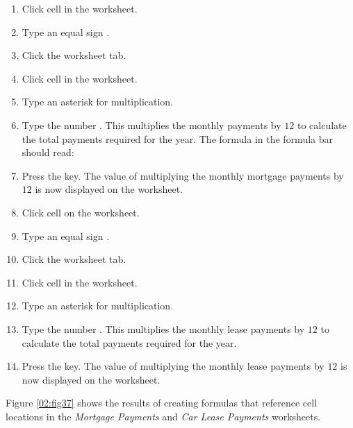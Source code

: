 \begin{enumbox}
	\begin{enumerate}
		\item Click cell  in the  worksheet.
		\item Type an equal sign \fmtTyping{=}.
		\item Click the  worksheet tab.
		\item Click cell  in the  worksheet.
		\item Type an asterisk \fmtTyping{*} for multiplication.
		\item Type the number . This multiplies the monthly payments by $ 12 $ to calculate the total payments required for the year. The formula in the formula bar should read: 
		\item Press the  key. The value of multiplying the monthly mortgage payments by $ 12 $ is now displayed on the  worksheet.
		\item Click cell  on the  worksheet.
		\item Type an equal sign \fmtTyping{=}.
		\item Click the  worksheet tab.
		\item Click cell  in the  worksheet.
		\item Type an asterisk \fmtTyping{*} for multiplication.
		\item Type the number . This multiplies the monthly lease payments by $ 12 $ to calculate the total payments required for the year.
		\item Press the  key. The value of multiplying the monthly lease payments by $ 12 $ is now displayed on the  worksheet.
	\end{enumerate}
\end{enumbox}

Figure \ref{02:fig37} shows the results of creating formulas that reference cell locations in the \textit{Mortgage Payments} and \textit{Car Lease Payments} worksheets.

